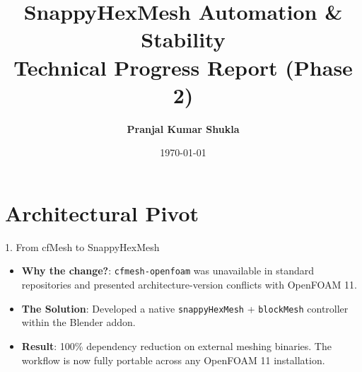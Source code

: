\documentclass[dvipsnames,mathserif]{beamer}
\begin{document}
\rightskip\rightmargin
\title{\textbf{SnappyHexMesh Automation \& Stability} \\ Technical Progress Report (Phase 2)}
\author{\Large \textbf{Pranjal Kumar Shukla}}
\footnotesize{\date{\today}}


\begin{frame}
\maketitle
\end{frame}

\section{Architectural Pivot}
\begin{frame}{1. From cfMesh to SnappyHexMesh}
    \begin{itemize}
        \item \textbf{Why the change?}: \texttt{cfmesh-openfoam} was unavailable in standard repositories and presented architecture-version conflicts with OpenFOAM 11.
        \item \textbf{The Solution}: Developed a native \texttt{snappyHexMesh} + \texttt{blockMesh} controller within the Blender addon.
        \item \textbf{Result}: 100\% dependency reduction on external meshing binaries. The workflow is now fully portable across any OpenFOAM 11 installation.
    \end{itemize}
    \begin{center}
    \end{center}
\end{frame}
\end{document}
